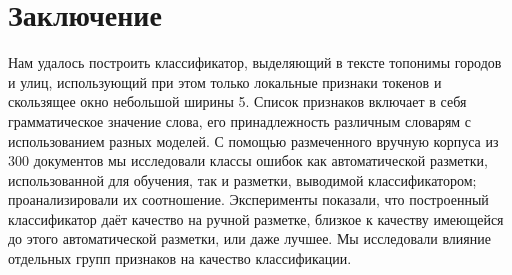 \documentclass[14pt,russian]{extreport}
\begin{document}
\chapter{Заключение}

Нам удалось построить классификатор, выделяющий в тексте топонимы городов и
улиц, использующий при этом только локальные признаки токенов и скользящее окно
небольшой ширины 5. Список признаков включает в себя грамматическое значение
слова, его принадлежность различным словарям с использованием разных моделей. С
помощью размеченного вручную корпуса из 300 документов мы исследовали классы
ошибок как автоматической разметки, использованной для обучения, так и
разметки, выводимой классификатором; проанализировали их соотношение.
Эксперименты показали, что построенный классификатор даёт качество на ручной
разметке, близкое к качеству имеющейся до этого автоматической разметки, или
даже лучшее. Мы исследовали влияние отдельных групп признаков на качество
классификации.

% 
\end{document}
